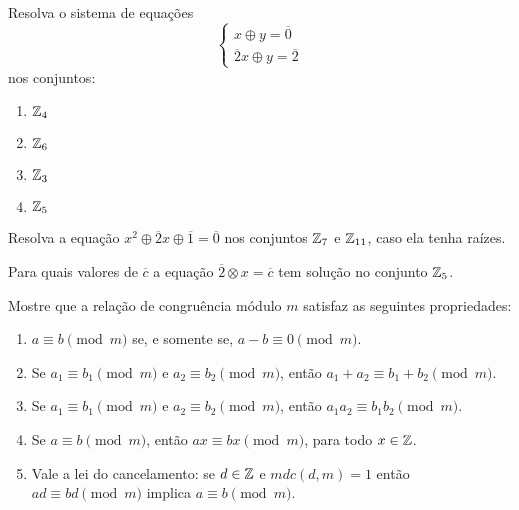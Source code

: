 \documentclass[12pt]{exam}
\begin{document}
    \vspace{.3cm}

    \questao{} Resolva o sistema de equações
    \[
    \begin{cases}
        x \oplus y = \overline{0}\\
        \overline{2}x \oplus y = \overline{2}
    \end{cases}
    \]
    nos conjuntos:
    \begin{multicols}{2}
        \begin{enumerate}[label=({\alph*})]
            \item $\mathbb{Z}_4$
            \item $\mathbb{Z}_6$
            \item $\mathbb{Z}_3$
            \item $\mathbb{Z}_5$
        \end{enumerate}
    \end{multicols}

    \vspace{.3cm}

    \questao{} Resolva a equação $x^2 \oplus \overline{2}x \oplus \overline{1} = \overline{0}$ nos conjuntos $\mathbb{Z}_7$ e $\mathbb{Z}_{11}$, caso ela tenha raízes.

    \vspace{.3cm}

    \questao{} Para quais valores de $\overline{c}$ a equação $\overline{2}\otimes x = \overline{c}$ tem solução no conjunto $\mathbb{Z}_5$.

    \vspace{.3cm}

    \questao{} Mostre que a relação de congruência módulo $m$ satisfaz as seguintes propriedades:
    \begin{enumerate}[label=({\alph*})]
        \item $a\equiv b\pmod{m}$ se, e somente se, $a - b\equiv 0\pmod{m}$.
        \item Se $a_{1}\equiv b_{1}\pmod{m}$ e $a_{2}\equiv b_{2}\pmod{m}$, então $a_{1}+a_{2}\equiv b_{1}+b_{2}\pmod{m}$.
        \item Se $a_{1}\equiv b_{1}\pmod{m}$ e $a_{2}\equiv b_{2}\pmod{m}$, então $a_{1}a_{2}\equiv b_{1}b_{2}\pmod{m}$.\label{item_provado}
        \item Se $a\equiv b\pmod{m}$, então $ax\equiv bx\pmod{m}$, para todo $x \in \mathbb{Z}$.
        \item Vale a lei do cancelamento: se $d \in \mathbb{Z}$ e $mdc(d,m) = 1$ então $ad \equiv bd \pmod{m}$ implica $a\equiv b \pmod{m}$.
    \end{enumerate}
\end{document}

